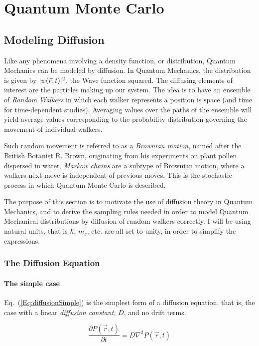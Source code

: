 \chapter{Quantum Monte Carlo}

\section{Modeling Diffusion}

Like any phenomena involving a density function, or distribution, Quantum Mechanics can be modeled by diffusion. In Quantum Mechanics, the distribution is given by $|\psi(\vec r, t)|^2$, the Wave function squared. The diffusing elements of interest are the particles making up our system. The idea is to have an ensemble of \textit{Random Walkers} in which each walker represents a position is space (and time for time-dependent studies). Averaging values over the paths of the ensemble will yield average values corresponding to the probability distribution governing the movement of individual walkers. 

Such random movement is referred to as a \textit{Brownian motion}, named after the British Botanist R. Brown, originating from his experiments on plant pollen dispersed in water. \textit{Markow chains} are a subtype of Brownian motion, where a walkers next move is independent of previous moves. This is the stochastic process in which Quantum Monte Carlo is described.

The purpose of this section is to motivate the use of diffusion theory in Quantum Mechanics, and to derive the sampling rules needed in order to model Quantum Mechanical distributions by diffusion of random walkers correctly. I will be using natural units, that is $\hbar$, $m_e$, etc. are all set to unity, in order to simplify the expressions.

\subsection{The Diffusion Equation}

\subsubsection{The simple case}

Eq.~(\ref{Eq:diffusionSimple}) is the simplest form of a diffusion equation, that is, the case with a linear \textit{diffusion constant}, $D$, and no drift terms.

\begin{equation}
 \frac{\partial P(\vec r, t)}{\partial t} = D\nabla^2 P(\vec r, t) 
 \label{Eq:diffusionSimple}
\end{equation}


